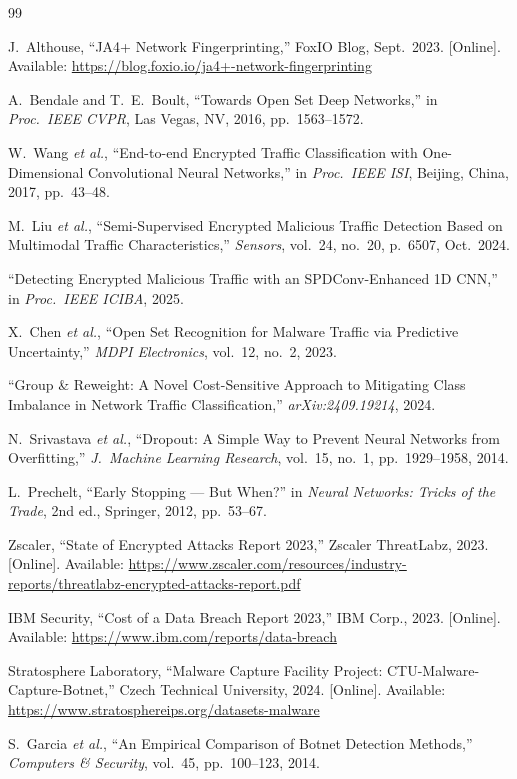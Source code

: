 \documentclass[12pt,a4paper]{report}
\begin{document}
\begin{thebibliography}{99}

J.~Althouse, ``JA4+ Network Fingerprinting,'' FoxIO Blog, Sept.\ 2023.
[Online]. Available: \url{https://blog.foxio.io/ja4+-network-fingerprinting}

A.~Bendale and T.~E.~Boult, ``Towards Open Set Deep Networks,''
in \textit{Proc.\ IEEE CVPR}, Las Vegas, NV, 2016, pp.~1563--1572.

W.~Wang \textit{et al.}, ``End-to-end Encrypted Traffic Classification with
One-Dimensional Convolutional Neural Networks,'' in \textit{Proc.\ IEEE ISI},
Beijing, China, 2017, pp.~43--48.

M.~Liu \textit{et al.}, ``Semi-Supervised Encrypted Malicious Traffic Detection
Based on Multimodal Traffic Characteristics,'' \textit{Sensors}, vol.~24,
no.~20, p.~6507, Oct.\ 2024.

``Detecting Encrypted Malicious Traffic with an SPDConv-Enhanced 1D CNN,''
in \textit{Proc.\ IEEE ICIBA}, 2025.

X.~Chen \textit{et al.}, ``Open Set Recognition for Malware Traffic via
Predictive Uncertainty,'' \textit{MDPI Electronics}, vol.~12, no.~2, 2023.

``Group \& Reweight: A Novel Cost-Sensitive Approach to Mitigating Class
Imbalance in Network Traffic Classification,'' \textit{arXiv:2409.19214}, 2024.

N.~Srivastava \textit{et al.}, ``Dropout: A Simple Way to Prevent Neural Networks
from Overfitting,'' \textit{J.\ Machine Learning Research}, vol.~15, no.~1,
pp.~1929--1958, 2014.

L.~Prechelt, ``Early Stopping --- But When?'' in \textit{Neural Networks: Tricks
of the Trade}, 2nd ed., Springer, 2012, pp.~53--67.

Zscaler, ``State of Encrypted Attacks Report 2023,'' Zscaler ThreatLabz, 2023.
[Online]. Available: \url{https://www.zscaler.com/resources/industry-reports/threatlabz-encrypted-attacks-report.pdf}

IBM Security, ``Cost of a Data Breach Report 2023,'' IBM Corp., 2023.
[Online]. Available: \url{https://www.ibm.com/reports/data-breach}

Stratosphere Laboratory, ``Malware Capture Facility Project: CTU-Malware-Capture-Botnet,''
Czech Technical University, 2024.
[Online]. Available: \url{https://www.stratosphereips.org/datasets-malware}

S.~Garcia \textit{et al.}, ``An Empirical Comparison of Botnet Detection Methods,''
\textit{Computers \& Security}, vol.~45, pp.~100--123, 2014.

\end{thebibliography}
\end{document}
